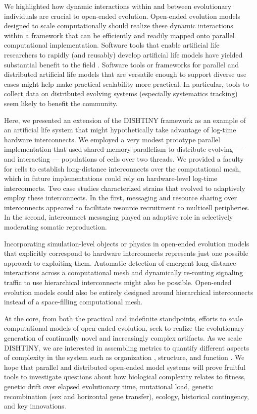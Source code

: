 We highlighted how dynamic interactions within and between evolutionary individuals are crucial to open-ended evolution.
Open-ended evolution models designed to scale computationally should realize these dynamic interactions within a framework that can be efficiently and readily mapped onto parallel computational implementation.
Software tools that enable artificial life researchers to rapidly (and reusably) develop artificial life models have yielded substantial benefit to the field \citep{bohm2017mabe, charles_ofria_2019_2575607}.
Software tools or frameworks for parallel and distributed artificial life models that are versatile enough to support diverse use cases might help make practical scalability more practical.
In particular, tools to collect data on distributed evolving systems (especially systematics tracking) seem likely to benefit the community.

Here, we presented an extension of the DISHTINY framework as an example of an artificial life system that might hypothetically take advantage of log-time hardware interconnects.
We employed a very modest prototype parallel implementation that used shared-memory parallelism to distribute evolving --- and interacting --- populations of cells over two threads.
We provided a faculty for cells to establish long-distance interconnects over the computational mesh, which in future implementations could rely on hardware-level log-time interconnects.
Two case studies characterized strains that evolved to adaptively employ these interconnects.
In the first, messaging and resource sharing over interconnects appeared to facilitate resource recruitment to multicell peripheries.
In the second, interconnect messaging played an adaptive role in selectively moderating somatic reproduction.

Incorporating simulation-level objects or physics in open-ended evolution models that explicitly correspond to hardware interconnects represents just one possible approach to exploiting them.
Automatic detection of emergent long-distance interactions across a computational mesh and dynamically re-routing signaling traffic to use hierarchical interconnects might also be possible.
Open-ended evolution models could also be entirely designed around hierarchical interconnects instead of a space-filling computational mesh.

At the core, from both the practical and indefinite standpoints, efforts to scale computational models of open-ended evolution, seek to realize the evolutionary generation of continually novel and increasingly complex artifacts.
As we scale DISHTINY, we are interested in assembling metrics to quantify different aspects of complexity in the system such as organization \citep{goldsby2012task}, structure, and function \citep{goldsby2014evolutionary}.
We hope that parallel and distributed open-ended model systems will prove fruitful tools to investigate questions about how biological complexity relates to fitness, genetic drift over elapsed evolutionary time, mutational load, genetic recombination (sex and horizontal gene transfer), ecology, historical contingency, and key innovations.

